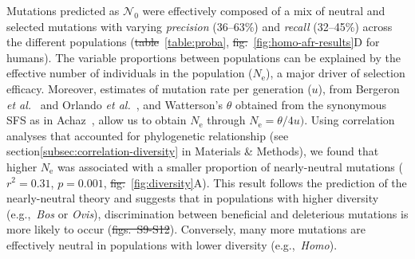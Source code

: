 \documentclass[10pt,letterpaper]{article}
\newcommand{\Ne}{N_{\text{e}}}
\newcommand{\SphyNeu}{\mathcal{N}_0}
\providecommand{\DIFaddtex}[1]{{\protect\color{blue}\uwave{#1}}} %
\providecommand{\DIFdeltex}[1]{{\protect\color{red}\sout{#1}}}                      %
\providecommand{\DIFaddbegin}{} %
\providecommand{\DIFaddend}{} %
\providecommand{\DIFdelbegin}{} %
\providecommand{\DIFdelend}{} %
\providecommand{\DIFadd}[1]{\texorpdfstring{\DIFaddtex{#1}}{#1}} %
\providecommand{\DIFdel}[1]{\texorpdfstring{\DIFdeltex{#1}}{}} %
\newcommand{\DIFscaledelfig}{0.5}
\newlength{\DIFdelgraphicswidth} %
\newlength{\DIFdelgraphicsheight} %
\newcommand{\DIFaddincludegraphics}[2][]{{\color{blue}\fbox{\DIFOincludegraphics[#1]{#2}}}} %
\newcommand{\DIFdelincludegraphics}[2][]{%
\sbox{\DIFdelgraphicsbox}{\DIFOincludegraphics[#1]{#2}}%
\settoboxwidth{\DIFdelgraphicswidth}{\DIFdelgraphicsbox} %
\settoboxtotalheight{\DIFdelgraphicsheight}{\DIFdelgraphicsbox} %
\scalebox{\DIFscaledelfig}{%
\parbox[b]{\DIFdelgraphicswidth}{\usebox{\DIFdelgraphicsbox}\\[-\baselineskip] \rule{\DIFdelgraphicswidth}{0em}}\llap{\resizebox{\DIFdelgraphicswidth}{\DIFdelgraphicsheight}{%
\setlength{\unitlength}{\DIFdelgraphicswidth}%
\begin{picture}(1,1)%
\thicklines\linethickness{2pt} %
{\color[rgb]{1,0,0}\put(0,0){\framebox(1,1){}}}%
{\color[rgb]{1,0,0}\put(0,0){\line( 1,1){1}}}%
{\color[rgb]{1,0,0}\put(0,1){\line(1,-1){1}}}%
\end{picture}%
}\hspace*{3pt}}} %
} %
\DeclareRobustCommand{\DIFaddbegin}{\DIFOaddbegin \let\includegraphics\DIFaddincludegraphics} %
\DeclareRobustCommand{\DIFaddend}{\DIFOaddend \let\includegraphics\DIFOincludegraphics} %
\DeclareRobustCommand{\DIFdelbegin}{\DIFOdelbegin \let\includegraphics\DIFdelincludegraphics} %
\DeclareRobustCommand{\DIFdelend}{\DIFOaddend \let\includegraphics\DIFOincludegraphics} %
\begin{document}
Mutations predicted as $\SphyNeu$ were effectively composed of a mix of neutral and selected mutations with varying \textit{precision} (36--63\%) and \textit{recall} (32--45\%) across the different populations (\DIFdelbegin \DIFdel{table}\DIFdelend \DIFaddbegin \DIFadd{Table}\DIFaddend ~\ref{table:proba}, \DIFdelbegin \DIFdel{fig.}\DIFdelend \DIFaddbegin \DIFadd{Fig}\DIFaddend ~\ref{fig:homo-afr-results}D for humans).
The variable proportions between populations can be explained by the effective number of individuals in the population ($\Ne$), a major driver of selection efficacy.
Moreover, estimates of mutation rate per generation ($u$), from Bergeron \textit{et al.}~\cite{bergeron_evolution_2023} and Orlando \textit{et al.}~\cite{orlando_recalibrating_2013}, and Watterson’s $\theta$ obtained from the synonymous SFS as in Achaz~\cite{achaz_frequency_2009}, allow us to obtain $\Ne$ through $\Ne=\theta/4 u)$.
Using correlation analyses that accounted for phylogenetic relationship (see section\DIFaddbegin \DIFadd{~}\DIFaddend \ref{subsec:correlation-diversity} in Materials \& Methods\DIFaddbegin \DIFadd{,~}\DIFaddend ), we found that higher $\Ne$ was associated with a smaller proportion of nearly-neutral mutations ($r^2=0.31$, $p=0.001$, \DIFdelbegin \DIFdel{fig.}\DIFdelend \DIFaddbegin \DIFadd{Fig}\DIFaddend ~\ref{fig:diversity}A).
This result follows the prediction of the nearly-neutral theory and suggests that in populations with higher diversity (e.g.,~\textit{Bos} or \textit{Ovis}), discrimination between beneficial and deleterious mutations is more likely to occur (\DIFdelbegin \DIFdel{figs.~S9-S12}\DIFdelend \DIFaddbegin {}\DIFadd{,~}\DIFadd{,~}\DIFaddend ).
Conversely, many more mutations are effectively neutral in populations with lower diversity (e.g.,~\textit{Homo}).
\end{document}
